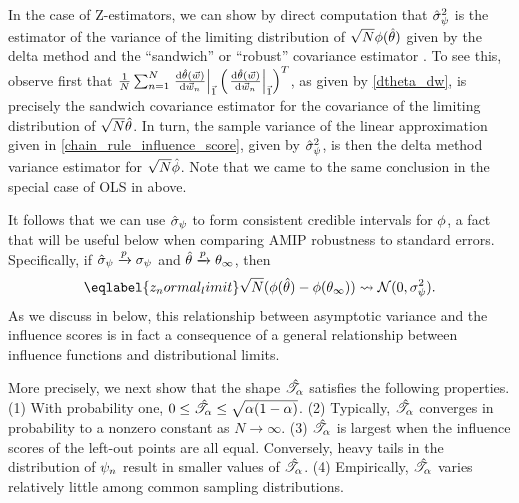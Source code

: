 %
In the case of Z-estimators, we can show by direct computation that
$\hat{\sigma}_{\psi}^2$ is the estimator of the variance of the limiting distribution of
$\sqrt{N}\phi(\hat{\theta})$ given by the delta method and the ``sandwich'' or
``robust'' covariance estimator \citep{huber1967sandwich,
stefanski:2002:mestimation}.  To see this, observe first that $\frac{1}{N}\sum_{n=1}^N
\left.\frac{\mathrm{d} \hat{\theta}(\vec{w})}{\mathrm{d} \vec{w}_n}\right|_{\vec{1}} \left( \left.\frac{\mathrm{d}
\hat{\theta}(\vec{w})}{\mathrm{d} \vec{w}_n}\right|_{\vec{1}}\right)^T$, as given by \eqref{dtheta_dw}, is
precisely the sandwich covariance estimator for the covariance of the limiting
distribution of $\sqrt{N} \hat{\theta}$.  In turn, the sample variance of the
linear approximation given in \eqref{chain_rule_influence_score}, given by
$\hat{\sigma}_{\psi}^2$, is then the delta method variance estimator for
$\sqrt{N}\hat{\phi}$.  Note that we came to the same conclusion in the special
case of OLS in  above.

It follows that we can use $\hat{\sigma}_{\psi}$ to form consistent credible intervals
for $\phi$, a fact that will be useful below when comparing AMIP robustness
to standard errors.  Specifically, if $\hat{\sigma}_{\psi} \xrightarrow{p} \sigma_{\psi}$ and
$\hat{\theta} \xrightarrow{p} \theta_{\infty}$, then
%
\begin{align}\eqlabel{z_normal_limit}
%
\sqrt{N}(\thetafun(\thetahat) -
\thetafun(\thetalim)) \dlim \mathcal{N}(0, \inflscalelim^2).
%
\end{align}
%
As we discuss in 
below, this relationship between asymptotic variance and the influence scores
is in fact a consequence of a general relationship between influence functions
and distributional limits.


%
More precisely, we next show that the shape $\hat{\mathscr{T}}_\alpha$ satisfies the following
properties. (1) With probability one, $0 \le \hat{\mathscr{T}}_\alpha \le
\sqrt{\alpha(1-\alpha)}$. (2) Typically, $\hat{\mathscr{T}}_\alpha$ converges in probability to a
nonzero constant as $N \rightarrow \infty$. (3) $\hat{\mathscr{T}}_\alpha$ is largest when the
influence scores of the left-out points are all equal. Conversely, heavy tails
in the distribution of $\psi_n$ result in smaller values of $\hat{\mathscr{T}}_\alpha$. (4)
Empirically, $\hat{\mathscr{T}}_\alpha$ varies relatively little among common sampling
distributions.

